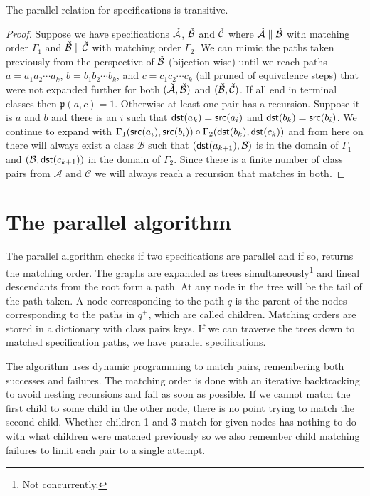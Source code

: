 \begin{proposition}
The parallel relation for specifications is transitive.
\end{proposition}
\begin{proof}
Suppose we have specifications $\check{\mathcal{A}}$, $\check{\mathcal{B}}$ and $\check{\mathcal{C}}$ where $\check{\mathcal{A}} \parallel \check{\mathcal{B}}$ with matching order $\Gamma_1$ and $\check{\mathcal{B}} \parallel \check{\mathcal{C}}$ with matching order $\Gamma_2$. We can mimic the paths taken previously from the perspective of $\check{\mathcal{B}}$ (bijection wise) until we reach paths $a = a_1a_2 \dotsm a_k$, $b = b_1b_2 \dotsm b_k$, and $c = c_1c_2 \dotsm c_k$ (all pruned of equivalence steps) that were not expanded further for both $(\check{\mathcal{A}},\check{\mathcal{B}})$ and $(\check{\mathcal{B}},\check{\mathcal{C}})$. If all end in terminal classes then $\mathfrak{p}(a,c)=1$. Otherwise at least one pair has a recursion. Suppose it is $a$ and $b$ and there is an $i$ such that $\textsf{dst}(a_k)=\textsf{src}(a_i)$ and $\textsf{dst}(b_k)=\textsf{src}(b_i)$. We continue to expand with $\Gamma_1(\textsf{src}(a_i),\textsf{src}(b_i)) \circ \Gamma_2(\textsf{dst}(b_k),\textsf{dst}(c_k))$ and from here on there will always exist a class $\mathcal{B}$ such that $(\textsf{dst}(a_{k+1}),\mathcal{B})$ is in the domain of $\Gamma_1$ and $(\mathcal{B}, \textsf{dst}(c_{k+1}))$ in the domain of $\Gamma_2$. Since there is a finite number of class pairs from $\mathcal{A}$ and $\mathcal{C}$ we will always reach a recursion that matches in both.
\end{proof}



\section{The parallel algorithm}
The parallel algorithm checks if two specifications are parallel and if so, returns the matching order. The graphs are expanded as trees simultaneously\footnote{Not concurrently.} and lineal descendants from the root form a path. At any node in the tree will be the tail of the path taken. A node corresponding to the path $q$ is the parent of the nodes corresponding to the paths in $q^+$, which are called children. Matching orders are stored in a dictionary with class pairs keys. If we can traverse the trees down to matched specification paths, we have parallel specifications.

The algorithm uses dynamic programming to match pairs, remembering both successes and failures. The matching order is done with an iterative backtracking to avoid nesting recursions and fail as soon as possible. If we cannot match the first child to some child in the other node, there is no point trying to match the second child. Whether children 1 and 3 match for given nodes has nothing to do with what children were matched previously so we also remember child matching failures to limit each pair to a single attempt.

